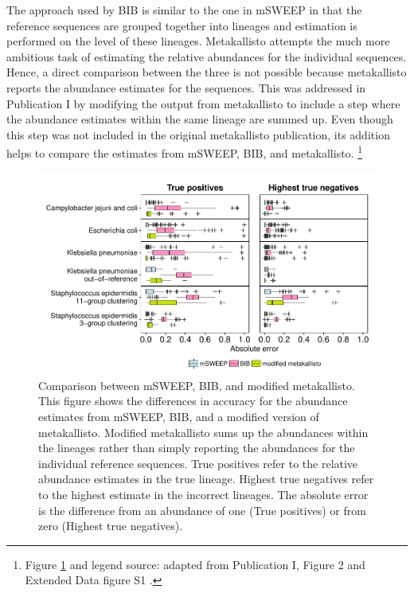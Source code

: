 \documentclass[officiallayout]{tktla}
\let\svthefootnote\thefootnote
\begin{document}
The approach used by BIB is similar to the one in mSWEEP in that the
reference sequences are grouped together into lineages and estimation
is performed on the level of these lineages. Metakallisto attempts the
much more ambitious task of estimating the relative abundances for the
individual sequences. Hence, a direct comparison between the three is
not possible because metakallisto reports the abundance estimates for
the sequences. This was addressed in Publication I by modifying the
output from metakallisto to include a step where the abundance
estimates within the same lineage are summed up. Even though this step was
not included in the original metakallisto publication, its addition helps to
compare the estimates from mSWEEP, BIB, and metakallisto.
\noindent\let\thefootnote\relax\footnote{Figure \ref{fig:msweep-bib-metakallisto} and legend source: adapted from Publication I, Figure 2 and Extended Data figure S1 \citep{maklin_bacterial_2021}.}
\addtocounter{footnote}{-1}\let\thefootnote\svthefootnote
\begin{figure}[!ht]
    \centering
    \includegraphics[height=0.75\textheight,width=\textwidth,keepaspectratio]{img/reproduced/WOR2021_mSWEEP_Figure_S1.pdf}
    \caption{Comparison between mSWEEP, BIB, and modified
      metakallisto. This figure shows the differences in accuracy for
      the abundance estimates from mSWEEP, BIB, and a modified version
      of metakallisto. Modified metakallisto sums up the abundances
      within the lineages rather than simply reporting the abundances
      for the individual reference sequences. True positives refer to
      the relative abundance estimates in the true lineage. Highest
      true negatives refer to the highest estimate in the incorrect
      lineages. The absolute error is the difference from an abundance
      of one (True positives) or from zero (Highest true negatives).}
  \label{fig:msweep-bib-metakallisto}
\end{figure}
\end{document}
